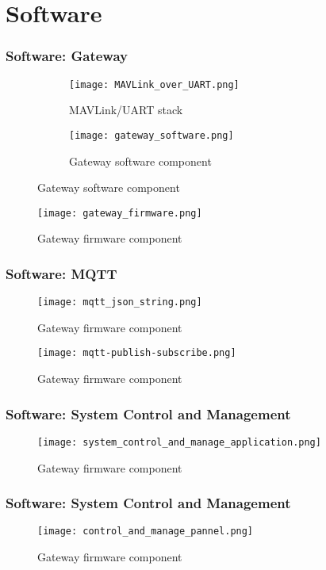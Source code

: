 \documentclass[10pt]{beamer}
\begin{document}
\section{Software}

\begin{frame}
    \frametitle{Software: Gateway}
    \begin{figure}[H]
        \centering
        \begin{subfigure}[b]{0.3\linewidth}
            \centering
            \texttt{[image: MAVLink\_over\_UART.png]}
            \caption{MAVLink/UART stack}
        \end{subfigure}
        \begin{subfigure}[b]{0.6\linewidth}
            \centering
            \texttt{[image: gateway\_software.png]}
            \caption{Gateway software component}
        \end{subfigure}
    \end{figure}
    \begin{figure}[H]
        \centering
        \texttt{[image: gateway\_firmware.png]}
        \caption{Gateway firmware component}
    \end{figure}
\end{frame}

\begin{frame}
    \frametitle{Software: MQTT}
    \begin{figure}[H]
        \centering
        \texttt{[image: mqtt\_json\_string.png]}
        \caption{Gateway firmware component}
    \end{figure}
    \begin{figure}[H]
        \centering
        \texttt{[image: mqtt-publish-subscribe.png]}
        \caption{Gateway firmware component}
    \end{figure}
\end{frame}

\begin{frame}
    \frametitle{Software: System Control and Management}
    \begin{figure}[H]
        \centering
        \texttt{[image: system\_control\_and\_manage\_application.png]}
        \caption{Gateway firmware component}
    \end{figure}
\end{frame}

\begin{frame}
    \frametitle{Software: System Control and Management}
    \begin{figure}[H]
        \centering
        \texttt{[image: control\_and\_manage\_pannel.png]}
        \caption{Gateway firmware component}
    \end{figure}
\end{frame}
\end{document}
